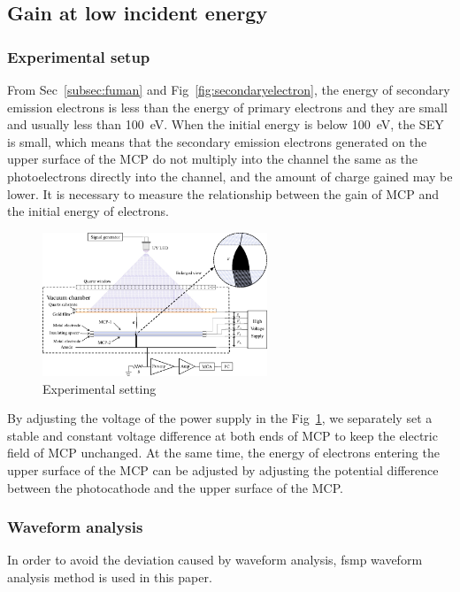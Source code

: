 \documentclass{article}
\begin{document}
\subsection{Gain at low incident energy}\label{sec:gain}
\subsubsection{Experimental setup}
From Sec~\ref{subsec:fuman} and Fig~\ref{fig:secondaryelectron},
the energy of secondary emission electrons is less than the energy of primary electrons and
they are small and usually less than \SI{100}{eV}.
When the initial energy is below \SI{100}{eV}, the SEY is small,
which means that the secondary emission electrons generated on the upper surface of the MCP
do not multiply into the channel the same as the photoelectrons directly into the channel,
and the amount of charge gained may be lower. It is necessary to measure the relationship between the gain of MCP
and the initial energy of electrons.
\begin{figure}[ht]
    \centering
    \includegraphics[width=0.6\textwidth]{pic/gain_ep_exp.pdf}
    \caption{Experimental setting}\label{fig:gain_exp}
\end{figure}
By adjusting the voltage of the power supply in the Fig~\ref{fig:gain_exp},
we separately set a stable and constant voltage difference at both ends of MCP to keep the electric field of MCP unchanged.
At the same time, the energy of electrons entering the upper surface of the MCP can be adjusted by
adjusting the potential difference between the photocathode and the upper surface of the MCP.
\subsubsection{Waveform analysis}
In order to avoid the deviation caused by waveform analysis, fsmp waveform analysis method is used in this paper.
\end{document}
